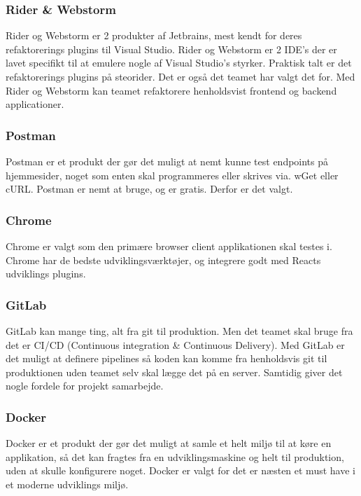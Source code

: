 \subsubsection{Rider \& Webstorm}

Rider og Webstorm er 2 produkter af Jetbrains, mest kendt for deres refaktorerings plugins til Visual Studio. Rider og Webstorm er 2 IDE's der er lavet specifikt til at emulere nogle af Visual Studio's styrker. Praktisk talt er det refaktorerings plugins på steorider. Det er også det teamet har valgt det for. Med Rider og Webstorm kan teamet refaktorere henholdsvist frontend og backend applicationer.

\subsubsection{Postman}

Postman er et produkt der gør det muligt at nemt kunne test endpoints på hjemmesider, noget som enten skal programmeres eller skrives via. wGet eller cURL. Postman er nemt at bruge, og er gratis. Derfor er det valgt.

\subsubsection{Chrome}

Chrome er valgt som den primære browser client applikationen skal testes i. Chrome har de bedste udviklingsværktøjer, og integrere godt med Reacts udviklings plugins.

\subsubsection{GitLab}

GitLab kan mange ting, alt fra git til produktion. Men det teamet skal bruge fra det er CI/CD (Continuous integration \& Continuous Delivery). Med GitLab er det muligt at definere pipelines så koden kan komme fra henholdsvis git til produktionen uden teamet selv skal lægge det på en server. Samtidig giver det nogle fordele for projekt samarbejde.

\subsubsection{Docker}

Docker er et produkt der gør det muligt at samle et helt miljø til at køre en applikation, så det kan fragtes fra en udviklingsmaskine og helt til produktion, uden at skulle konfigurere noget. Docker er valgt for det er næsten et must have i et moderne udviklings miljø.

